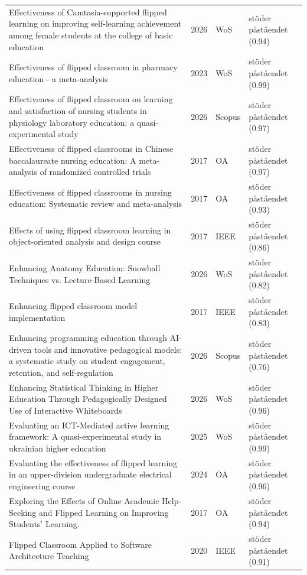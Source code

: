 \begin{longtable}{@{}%
  >{\raggedright\arraybackslash}p{}c%
  >{\raggedright\arraybackslash}p{}%
  >{\raggedright\arraybackslash}p{}@{}}
Effectiveness of Camtasia-supported flipped learning on improving self-learning achievement among female students at the college of basic education & 2026 & WoS & stöder påståendet (0.94) \\
Effectiveness of flipped classroom in pharmacy education - a meta-analysis & 2023 & WoS & stöder påståendet (0.99) \\
Effectiveness of flipped classroom on learning and satisfaction of nursing students in physiology laboratory education: a quasi-experimental study & 2026 & Scopus & stöder påståendet (0.97) \\
Effectiveness of flipped classrooms in Chinese baccalaureate nursing education: A meta-analysis of randomized controlled trials & 2017 & OA & stöder påståendet (0.97) \\
Effectiveness of flipped classrooms in nursing education: Systematic review and meta-analysis & 2017 & OA & stöder påståendet (0.93) \\
Effects of using flipped classroom learning in object-oriented analysis and design course & 2017 & IEEE & stöder påståendet (0.86) \\
Enhancing Anatomy Education: Snowball Techniques vs. Lecture-Based Learning & 2026 & WoS & stöder påståendet (0.82) \\
Enhancing flipped classroom model implementation & 2017 & IEEE & stöder påståendet (0.83) \\
Enhancing programming education through AI-driven tools and innovative pedagogical models: a systematic study on student engagement, retention, and self-regulation & 2026 & Scopus & stöder påståendet (0.76) \\
Enhancing Statistical Thinking in Higher Education Through Pedagogically Designed Use of Interactive Whiteboards & 2026 & WoS & stöder påståendet (0.96) \\
Evaluating an ICT-Mediated active learning framework: A quasi-experimental study in ukrainian higher education & 2025 & WoS & stöder påståendet (0.99) \\
Evaluating the effectiveness of flipped learning in an upper-division undergraduate electrical engineering course & 2024 & OA & stöder påståendet (0.96) \\
Exploring the Effects of Online Academic Help-Seeking and Flipped Learning on Improving Students' Learning. & 2017 & OA & stöder påståendet (0.94) \\
Flipped Classroom Applied to Software Architecture Teaching & 2020 & IEEE & stöder påståendet (0.91) \\

\end{longtable}
